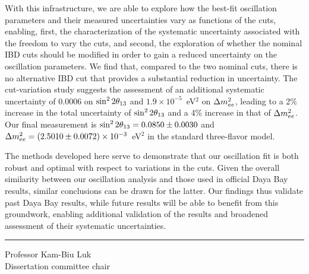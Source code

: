 With this infrastructure, we are able to explore how the best-fit oscillation parameters and their measured uncertainties vary as functions of the cuts, enabling, first, the characterization of the systematic uncertainty associated with the freedom to vary the cuts, and second, the exploration of whether the nominal IBD cuts should be modified in order to gain a reduced uncertainty on the oscillation parameters. We find that, compared to the two nominal cuts, there is no alternative IBD cut that provides a substantial reduction in uncertainty. The cut-variation study suggests the assessment of an additional systematic uncertainty of 0.0006 on $\sin^2 2\theta_{13}$ and $1.9\times10^{-5}$~eV$^2$ on $\Delta m^2_{ee}$, leading to a 2\% increase in the total uncertainty of $\sin^2 2\theta_{13}$ and a 4\% increase in that of $\Delta m^2_{ee}$. Our final measurement is $\sin^2 2\theta_{13} = 0.0850 \pm 0.0030$ and $\Delta m^2_{ee} = (2.5010 \pm 0.0072) \times 10^{-3}$~eV$^2$ in the standard three-flavor model.

The methods developed here serve to demonstrate that our oscillation fit is both robust and optimal with respect to variations in the cuts. Given the overall similarity between our oscillation analysis and those used in official Daya Bay results, similar conclusions can be drawn for the latter. Our findings thus validate past Daya Bay results, while future results will be able to benefit from this groundwork, enabling additional validation of the results and broadened assessment of their systematic uncertainties.

%

\SingleSpacing
\vspace{2.5\baselineskip}
\hfill
\begin{minipage}{0.4\textwidth}
  \hrule\vspace{0.4\baselineskip}
  Professor Kam-Biu Luk\\
  Dissertation committee chair
\end{minipage}

\clearpage